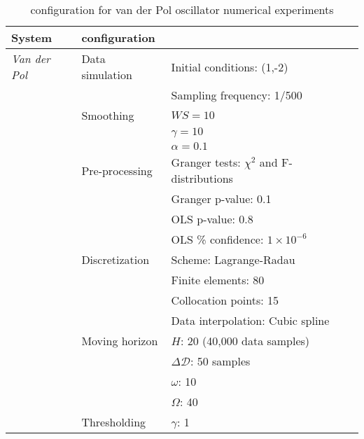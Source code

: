 \documentclass[12pt]{article}
\begin{document}
\begin{table}[htb]
\caption{\ours{} configuration for van der Pol oscillator numerical experiments}
\vspace{-0.2in}
\label{tb:VDP_dysmo}
\begin{center}
\begin{tabular}{l l l}
\hline
\textbf{System}  &  \textbf{\ours{} configuration} &  \\
\hline
\hline
\textit{Van der Pol}  & {Data simulation} & Initial conditions: (1,-2)	\\
 & & Sampling frequency: 1/500  \\
 &  {Smoothing} 	& $WS=10$   \\
 & & $\gamma=10$   \\
 & & $\alpha=0.1$   \\
 & {Pre-processing} & Granger tests: $\chi^2$ and F-distributions \\
 &  & Granger p-value: 0.1 \\
 & & OLS p-value: 0.8 \\
 & & OLS \% confidence: $1\times 10^{-6}$ \\
 & {Discretization} & Scheme: Lagrange-Radau \\
 & & Finite elements: 80 \\
 & & Collocation points: 15 \\
 & & Data interpolation: Cubic spline  \\
 & {Moving horizon} & $H$: 20 (40,000 data samples) \\
 & & $\Delta \mathcal{D}$: 50 samples \\
 & & $\omega$: 10 \\
 & & $\Omega$: 40 \\
 & {Thresholding} & $\gamma$: 1 \\
\hline
\end{tabular}
\end{center}
\end{table}
\end{document}
